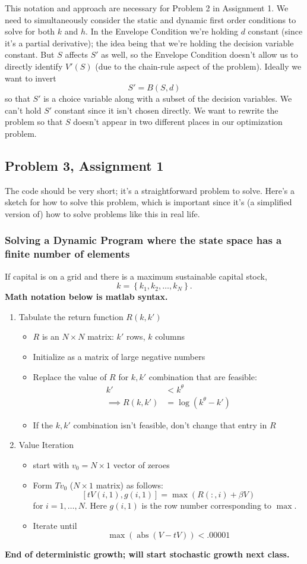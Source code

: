 \documentclass[11pt]{article}
\begin{document}
This notation and approach are necessary for Problem 2 in Assignment 1. We need to simultaneously consider the static and dynamic first order conditions to solve for both \(k\) and \(h\). In the Envelope Condition we're holding \(d\) constant (since it's a partial derivative); the idea being that we're holding the decision variable constant. But \(S\) affects \(S'\) as well, so the Envelope Condition doesn't allow us to directly identify \(V'(S)\) (due to the chain-rule aspect of the problem). Ideally we want to invert
\[
S' = B(S, d)
\]
so that \(S'\) is a choice variable along with a subset of the decision variables. We can't hold \(S'\) constant since it isn't chosen directly. We want to rewrite the problem so that \(S\) doesn't appear in two different places in our optimization problem.

\subsection{Problem 3, Assignment 1}
\label{sec:orgceac077}
The code should be very short; it's a straightforward problem to solve. Here's a sketch for how to solve this problem, which is important since it's (a simplified version of) how to solve problems like this in real life. 

\subsubsection{Solving a Dynamic Program where the state space has a finite number of elements}
\label{sec:orgd79050c}
If capital is on a grid and there is a maximum sustainable capital stock, 
\[
k = \left\{k_1, k_2, \ldots, k_N\right\}.
\]
\textbf{Math notation below is matlab syntax.}
\begin{enumerate}
\item Tabulate the return function $R(k, k')$
\begin{itemize}
\item $R$ is an $N \times N$ matrix: $k'$ rows, $k$ columns
\item Initialize as a matrix of large negative numbers
\item Replace the value of $R$ for $k, k'$ combination that are feasible:
\begin{align*}
k' &< k^\theta \tag{$c$ positive}\\
\implies R(k, k') &= \log(k^\theta - k')
\end{align*}
\item If the $k, k'$ combination isn't feasible, don't change that entry in $R$
\end{itemize}
\item Value Iteration
\begin{itemize}
\item start with $v_0 = N \times 1$ vector of zeroes
\item Form $Tv_0$ ($N \times 1$ matrix) as follows:
\[
[tV(i, 1), g(i, 1)] = \max (R(:, i) + \beta V)
\]
for $i = 1, \ldots, N$. Here $g(i, 1)$ is the row number corresponding to $\max$.
\item Iterate until
\[
\max(\operatorname{abs}(V - tV)) < .00001
\]
\end{itemize}
\end{enumerate}

\textbf{End of deterministic growth; will start stochastic growth next class.}
\end{document}
